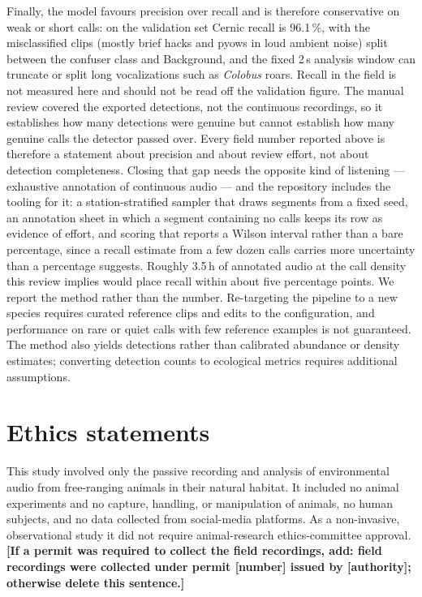 \documentclass[final,3p,times]{elsarticle}
\begin{document}
Finally, the model favours precision over recall and is therefore conservative
on weak or short calls: on the validation set Cernic recall is 96.1\,\%, with
the misclassified clips (mostly brief hacks and pyows in loud ambient noise)
split between the confuser class and Background, and the fixed 2\,s analysis
window can truncate or split long vocalizations such as \textit{Colobus} roars.
Recall in the field is not measured here and should not be read off the
validation figure. The manual review covered the exported detections, not the
continuous recordings, so it establishes how many detections were genuine but
cannot establish how many genuine calls the detector passed over. Every field
number reported above is therefore a statement about precision and about review
effort, not about detection completeness. Closing that gap needs the opposite
kind of listening --- exhaustive annotation of continuous audio --- and the
repository includes the tooling for it: a station-stratified sampler that draws
segments from a fixed seed, an annotation sheet in which a segment containing no
calls keeps its row as evidence of effort, and scoring that reports a Wilson
interval rather than a bare percentage, since a recall estimate from a few dozen
calls carries more uncertainty than a percentage suggests. Roughly 3.5\,h of
annotated audio at the call density this review implies would place recall within
about five percentage points. We report the method rather than the number.
Re-targeting the pipeline to a new species requires curated reference clips and
edits to the configuration, and performance on rare or quiet calls with few
reference examples is not guaranteed. The method also yields detections rather
than calibrated abundance or density estimates; converting detection counts to
ecological metrics requires additional assumptions.

\section*{Ethics statements}

This study involved only the passive recording and analysis of environmental
audio from free-ranging animals in their natural habitat. It included no
animal experiments and no capture, handling, or manipulation of animals, no
human subjects, and no data collected from social-media platforms. As a
non-invasive, observational study it did not require animal-research
ethics-committee approval. \textbf{[If a permit was required to collect the
field recordings, add: field recordings were collected under permit [number]
issued by [authority]; otherwise delete this sentence.]}
\end{document}
